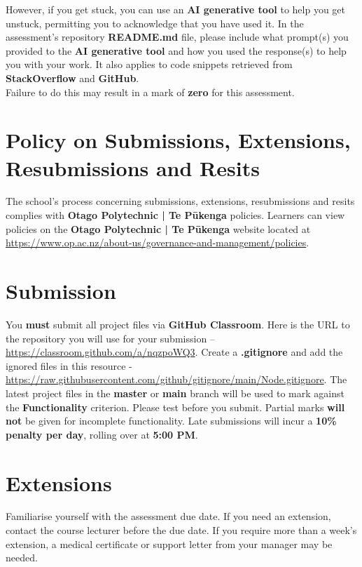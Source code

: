 \documentclass{article}
\begin{document}
 However, if you get stuck, you can use an \textbf{AI generative tool} to help you get unstuck, permitting you to acknowledge that you have used it. In the assessment's repository \textbf{README.md} file, please include what prompt(s) you provided to the \textbf{AI generative tool} and how you used the response(s) to help you with your work. It also applies to code snippets retrieved from \textbf{StackOverflow} and \textbf{GitHub}. \\
 
 Failure to do this may result in a mark of \textbf{zero} for this assessment.

\section*{Policy on Submissions, Extensions, Resubmissions and Resits}
The school's process concerning submissions, extensions, resubmissions and resits complies with \textbf{Otago Polytechnic | Te Pūkenga} policies. Learners can view policies on the \textbf{Otago Polytechnic | Te Pūkenga} website located at \href{https://www.op.ac.nz/about-us/governance-and-management/policies}{https://www.op.ac.nz/about-us/governance-and-management/policies}. 

\section*{Submission}
You \textbf{must} submit all project files via \textbf{GitHub Classroom}. Here is the URL to the repository you will use for your submission – \href{https://classroom.github.com/a/nqzpoWQ3}{https://classroom.github.com/a/nqzpoWQ3}.  Create a \textbf{.gitignore} and add the ignored files in this resource - \href{https://raw.githubusercontent.com/github/gitignore/main/Node.gitignore}{https://raw.githubusercontent.com/github/gitignore/main/Node.gitignore}. The latest project files in the \textbf{master} or \textbf{main} branch will be used to mark against the \textbf{Functionality} criterion. Please test before you submit. Partial marks \textbf{will not} be given for incomplete functionality. Late submissions will incur a \textbf{10\% penalty per day}, rolling over at \textbf{5:00 PM}.

\section*{Extensions}
Familiarise yourself with the assessment due date. If you need an extension, contact the course lecturer before the due date. If you require more than a week's extension, a medical certificate or support letter from your manager may be needed.
\end{document}
